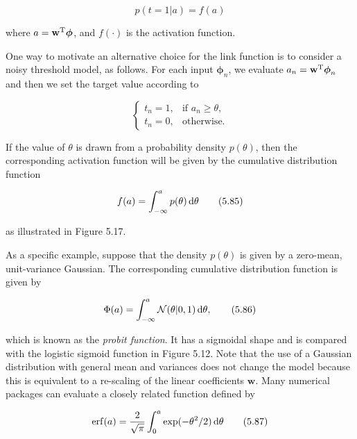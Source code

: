 \documentclass{article}
\begin{document}
\begin{equation}
p(t=1|a)=f(a)
\tag{5.83}
\end{equation}

where $a=\mathbf{w}^{\rm T}\boldsymbol{\phi}$, and $f(\cdot)$ is the activation function.

One way to motivate an alternative choice for the link function is to consider a noisy threshold model, as follows. For each input $\boldsymbol{\phi}_{n}$, we evaluate $a_{n}=\mathbf{w}^{\rm T}\boldsymbol{\phi}_{n}$ and then we set the target value according to

\begin{equation}
\begin{cases}t_{n}=1, & \text{if } a_{n}\geqslant\theta,\\ t_{n}=0, & \text{otherwise.}\end{cases}
\tag{5.84}
\end{equation}

If the value of $\theta$ is drawn from a probability density $p(\theta)$, then the corresponding activation function will be given by the cumulative distribution function

\begin{equation}
f(a)=\int_{-\infty}^{a}p(\theta)\,{\rm d}\theta
\tag{5.85}
\end{equation}

as illustrated in Figure 5.17.

As a specific example, suppose that the density $p(\theta)$ is given by a zero-mean, unit-variance Gaussian. The corresponding cumulative distribution function is given by

\begin{equation}
\Phi(a)=\int_{-\infty}^{a}\mathcal{N}(\theta|0,1)\,{\rm d}\theta,
\tag{5.86}
\end{equation}

which is known as the \textit{probit function}. It has a sigmoidal shape and is compared with the logistic sigmoid function in Figure 5.12. Note that the use of a Gaussian distribution with general mean and variances does not change the model because this is equivalent to a re-scaling of the linear coefficients $\mathbf{w}$. Many numerical packages can evaluate a closely related function defined by

\begin{equation}
{\rm erf}(a)=\frac{2}{\sqrt{\pi}}\int_{0}^{a}\exp(-\theta^{2}/2)\,{\rm d}\theta
\tag{5.87}
\end{equation}
\end{document}
